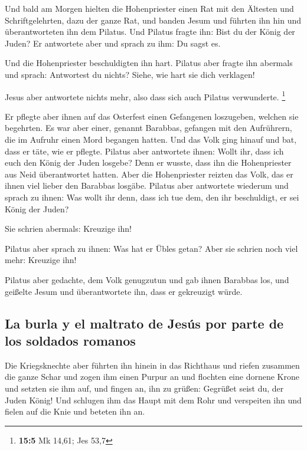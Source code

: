  Und bald am Morgen hielten die Hohenpriester einen Rat
mit den Ältesten und Schriftgelehrten, dazu der ganze Rat, und banden
Jesum und führten ihn hin und überantworteten ihn dem Pilatus.
 Und Pilatus fragte ihn: Bist du der König der Juden? Er
antwortete aber und sprach zu ihm: Du sagst es.

 Und die Hohenpriester beschuldigten ihn hart.
 Pilatus aber fragte ihn abermals und sprach: Antwortest
du nichts? Siehe, wie hart sie dich verklagen!

 Jesus aber antwortete nichts mehr, also dass sich auch
Pilatus verwunderte. \footnote{\textbf{15:5} Mk 14,61; Jes 53,7}

 Er pflegte aber ihnen auf das Osterfest einen Gefangenen
loszugeben, welchen sie begehrten.  Es war aber einer,
genannt Barabbas, gefangen mit den Aufrührern, die im Aufruhr einen Mord
begangen hatten.  Und das Volk ging hinauf und bat, dass
er täte, wie er pflegte.  Pilatus aber antwortete ihnen:
Wollt ihr, dass ich euch den König der Juden losgebe? 
Denn er wusste, dass ihn die Hohenpriester aus Neid überantwortet
hatten.  Aber die Hohenpriester reizten das Volk, das er
ihnen viel lieber den Barabbas losgäbe.  Pilatus aber
antwortete wiederum und sprach zu ihnen: Was wollt ihr denn, dass ich
tue dem, den ihr beschuldigt, er sei König der Juden?

 Sie schrien abermals: Kreuzige ihn!

 Pilatus aber sprach zu ihnen: Was hat er Übles getan?
Aber sie schrien noch viel mehr: Kreuzige ihn!

 Pilatus aber gedachte, dem Volk genugzutun und gab ihnen
Barabbas los, und geißelte Jesum und überantwortete ihn, dass er
gekreuzigt würde.

\hypertarget{la-burla-y-el-maltrato-de-jesuxfas-por-parte-de-los-soldados-romanos}{%
\subsection{La burla y el maltrato de Jesús por parte de los soldados
romanos}\label{la-burla-y-el-maltrato-de-jesuxfas-por-parte-de-los-soldados-romanos}}

 Die Kriegsknechte aber führten ihn hinein in das
Richthaus und riefen zusammen die ganze Schar  und zogen
ihm einen Purpur an und flochten eine dornene Krone und setzten sie ihm
auf,  und fingen an, ihn zu grüßen: Gegrüßet seist du,
der Juden König!  Und schlugen ihm das Haupt mit dem Rohr
und verspeiten ihn und fielen auf die Knie und beteten ihn an.

